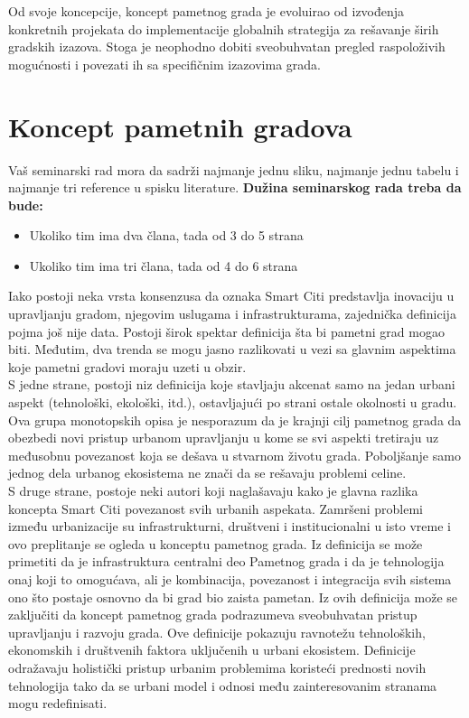 \documentclass[a4paper,12pt]{article}
\begin{document}
{Od svoje koncepcije, koncept pametnog grada je evoluirao od izvođenja konkretnih projekata do implementacije globalnih strategija za rešavanje širih gradskih izazova. Stoga je neophodno dobiti sveobuhvatan pregled raspoloživih mogućnosti i povezati ih sa specifičnim izazovima grada.


\section{Koncept pametnih gradova}
Vaš seminarski rad mora da sadrži najmanje jednu sliku, najmanje jednu tabelu i najmanje tri reference u spisku literature. \textbf{Dužina seminarskog rada treba da bude:}
\begin{itemize}
\item Ukoliko tim ima dva člana, tada od 3 do 5 strana
\item Ukoliko tim ima tri člana, tada od 4 do 6 strana
\end{itemize} 

Iako postoji neka vrsta konsenzusa da oznaka Smart Citi predstavlja inovaciju u upravljanju gradom, njegovim uslugama i infrastrukturama, zajednička definicija pojma još nije data. Postoji širok spektar definicija šta bi pametni grad mogao biti. Međutim, dva trenda se mogu jasno razlikovati u vezi sa glavnim aspektima koje pametni gradovi moraju uzeti u obzir. \\

S jedne strane, postoji niz definicija koje stavljaju akcenat samo na jedan urbani aspekt (tehnološki, ekološki, itd.), ostavljajući po strani ostale okolnosti u gradu. Ova grupa monotopskih opisa je nesporazum da je krajnji cilj pametnog grada da obezbedi novi pristup urbanom upravljanju u kome se svi aspekti tretiraju uz međusobnu povezanost koja se dešava u stvarnom životu grada. Poboljšanje samo jednog dela urbanog ekosistema ne znači da se rešavaju problemi celine. \\

S druge strane, postoje neki autori koji naglašavaju kako je glavna razlika koncepta Smart Citi povezanost svih urbanih aspekata. Zamršeni problemi između urbanizacije su infrastrukturni, društveni i institucionalni u isto vreme i ovo preplitanje se ogleda u konceptu pametnog grada. Iz definicija se može primetiti da je infrastruktura centralni deo Pametnog grada i da je tehnologija onaj koji to omogućava, ali je kombinacija, povezanost i integracija svih sistema ono što postaje osnovno da bi grad bio zaista pametan. Iz ovih definicija može se zaključiti da koncept pametnog grada podrazumeva sveobuhvatan pristup upravljanju i razvoju grada. Ove definicije pokazuju ravnotežu tehnoloških, ekonomskih i društvenih faktora uključenih u urbani ekosistem. Definicije odražavaju holistički pristup urbanim problemima koristeći prednosti novih tehnologija tako da se urbani model i odnosi među zainteresovanim stranama mogu redefinisati.\\



}
\end{document}
